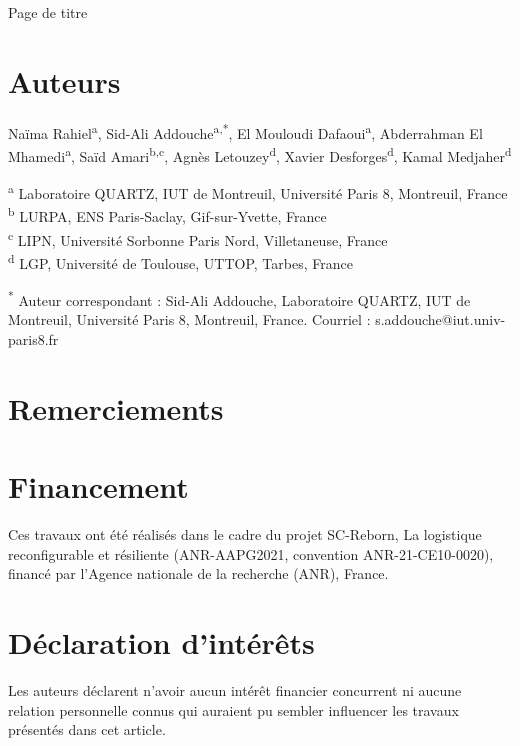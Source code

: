 \documentclass[a4paper,11pt]{article}
\begin{document}
\begin{center}
{\Large\bfseries \ArticleTitle\par}
\vspace{10pt}
{\large Page de titre\par}
\end{center}

\section*{Auteurs}

Naïma Rahiel\textsuperscript{a},
Sid-Ali Addouche\textsuperscript{a,*},
El Mouloudi Dafaoui\textsuperscript{a},
Abderrahman El Mhamedi\textsuperscript{a},
Saïd Amari\textsuperscript{b,c},
Agnès Letouzey\textsuperscript{d},
Xavier Desforges\textsuperscript{d},
Kamal Medjaher\textsuperscript{d}

\textsuperscript{a} Laboratoire QUARTZ, IUT de Montreuil, Université Paris 8, Montreuil, France\\
\textsuperscript{b} LURPA, ENS Paris-Saclay, Gif-sur-Yvette, France\\
\textsuperscript{c} LIPN, Université Sorbonne Paris Nord, Villetaneuse, France\\
\textsuperscript{d} LGP, Université de Toulouse, UTTOP, Tarbes, France

\textsuperscript{*} Auteur correspondant : Sid-Ali Addouche, Laboratoire QUARTZ, IUT de Montreuil, Université Paris 8, Montreuil, France. Courriel : s.addouche@iut.univ-paris8.fr

\section*{Remerciements}


\section*{Financement}

Ces travaux ont été réalisés dans le cadre du projet SC-Reborn, \og La logistique reconfigurable et résiliente \fg{} (ANR-AAPG2021, convention ANR-21-CE10-0020), financé par l'Agence nationale de la recherche (ANR), France.

\section*{Déclaration d'intérêts}

Les auteurs déclarent n'avoir aucun intérêt financier concurrent ni aucune relation personnelle connus qui auraient pu sembler influencer les travaux présentés dans cet article.


\end{document}

